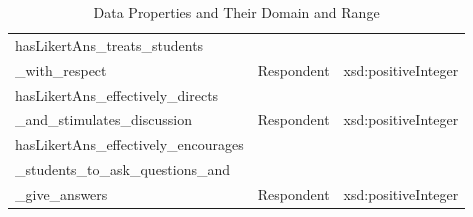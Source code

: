 \begin{doublespace}
\begin{table}[h!]
\begin{tabular}{|l|l|l|}
     hasLikertAns\_treats\_students&\\ \_with\_respect & \multirow{-2}{5em}{Respondent} & \multirow{-2}{8.5em}{xsd:positiveInteger}\\ \hline
     hasLikertAns\_effectively\_directs&\\ \_and\_stimulates\_discussion & \multirow{-2}{5em}{Respondent} & \multirow{-2}{8.5em}{xsd:positiveInteger}\\ \hline
     hasLikertAns\_effectively\_encourages&\\ \_students\_to\_ask\_questions\_and&\\ \_give\_answers & \multirow{-3}{5em}{Respondent} & \multirow{-3}{8.5em}{xsd:positiveInteger}\\ \hline
    \end{tabular}
    \caption{Data Properties and Their Domain and Range}
    \label{table:4.4}
    \end{table}

\end{doublespace}
